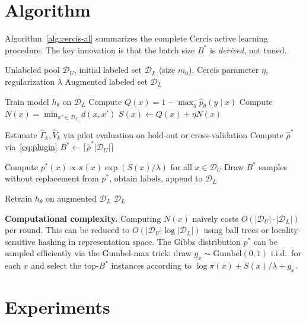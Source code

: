 \documentclass[12pt,a4paper]{article}
\newcommand{\cD}{\mathcal{D}}
\begin{document}
\section{Algorithm}

Algorithm~\ref{alg:cercis-al} summarizes the complete Cercis active learning
procedure.  The key innovation is that the batch size $B^*$ is
\emph{derived}, not tuned.

\begin{algorithm}[tb]
\caption{Cercis Optimal Active Learning (COAL)}
\label{alg:cercis-al}
\begin{algorithmic}[1]
\Require Unlabeled pool $\cD_U$, initial labeled set $\cD_L$ (size $m_0$),
         Cercis parameter $\eta$, regularization $\lambda$
\Ensure Augmented labeled set $\cD_L$

\State Train model $h_\theta$ on $\cD_L$
\For{$x\in\cD_U$}
    \State Compute $Q(x)=1-\max_y\hat{p}_\theta(y\mid x)$
    \State Compute $N(x)=\min_{x'\in\cD_L} d(x,x')$
    \State $S(x)\gets Q(x)+\eta N(x)$
\EndFor

\State Estimate $\widehat{\Gamma}_k,\widehat{V}_k$ via pilot evaluation
       on hold-out or cross-validation
\State Compute $\hat{\rho}^*$ via~\eqref{eq:plugin}
\State $B^* \gets \lceil\hat{\rho}^*|\cD_U|\rceil$

\State Compute $p^*(x)\propto\pi(x)\exp(S(x)/\lambda)$ for all $x\in\cD_U$
\State Draw $B^*$ samples without replacement from $p^*$, obtain labels,
       append to $\cD_L$

\State Retrain $h_\theta$ on augmented $\cD_L$
\State \Return $\cD_L$
\end{algorithmic}
\end{algorithm}

\medskip\noindent
\textbf{Computational complexity.}
Computing $N(x)$ naively costs $O(|\cD_U|\cdot|\cD_L|)$ per round.
This can be reduced to $O(|\cD_U|\log|\cD_L|)$ using ball trees or
locality-sensitive hashing in representation space.
The Gibbs distribution $p^*$ can be sampled efficiently via
the Gumbel-max trick: draw $g_x\sim\text{Gumbel}(0,1)$ i.i.d.\ for each
$x$ and select the top-$B^*$ instances according to
$\log\pi(x)+S(x)/\lambda+g_x$.

\section{Experiments}
\end{document}
